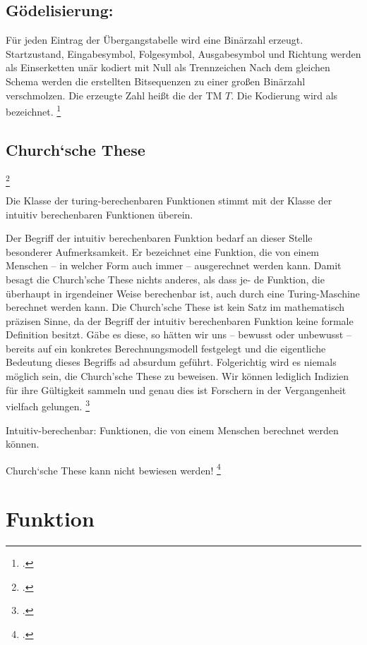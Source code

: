 \documentclass{lehramt-informatik-haupt}
\begin{document}
\subsection{Gödelisierung:}

Für jeden Eintrag der Übergangstabelle wird eine Binärzahl erzeugt.
Startzustand, Eingabesymbol, Folgesymbol, Ausgabesymbol und Richtung
werden als Einserketten unär kodiert mit Null als Trennzeichen Nach dem
gleichen Schema werden die erstellten Bitsequenzen zu einer großen
Binärzahl verschmolzen. Die erzeugte Zahl heißt die 
der TM $T$. Die Kodierung wird als  bezeichnet.
\footcite[Seite 23]{theo:fs:4}

\subsection{Church‘sche These}
\footcite{wiki:church-these}

Die Klasse der turing-berechenbaren Funktionen stimmt mit der
Klasse der intuitiv berechenbaren Funktionen überein.

Der Begriff der intuitiv berechenbaren Funktion bedarf an dieser Stelle
besonderer Aufmerksamkeit. Er bezeichnet eine Funktion, die von einem
Menschen – in welcher Form auch immer – ausgerechnet werden kann. Damit
besagt die Church’sche These nichts anderes, als dass je- de Funktion,
die überhaupt in irgendeiner Weise berechenbar ist, auch durch eine
Turing-Maschine berechnet werden kann. Die Church’sche These ist kein
Satz im mathematisch präzisen Sinne, da der Begriff der intuitiv
berechenbaren Funktion keine formale Definition besitzt. Gäbe es
diese, so hätten wir uns – bewusst oder unbewusst – bereits auf ein
konkretes Berechnungsmodell festgelegt und die eigentliche Bedeutung
dieses Begriffs ad absurdum geführt. Folgerichtig wird es niemals
möglich sein, die Church’sche These zu beweisen. Wir können lediglich
Indizien für ihre Gültigkeit sammeln und genau dies ist Forschern in der
Vergangenheit vielfach gelungen.
\footcite[Seite 308]{hoffmann}

Intuitiv-berechenbar:
Funktionen, die von einem Menschen berechnet werden können.

Church‘sche These kann nicht bewiesen werden!
\footcite[Seite 27]{theo:fs:4}

\section{Funktion}
\end{document}
